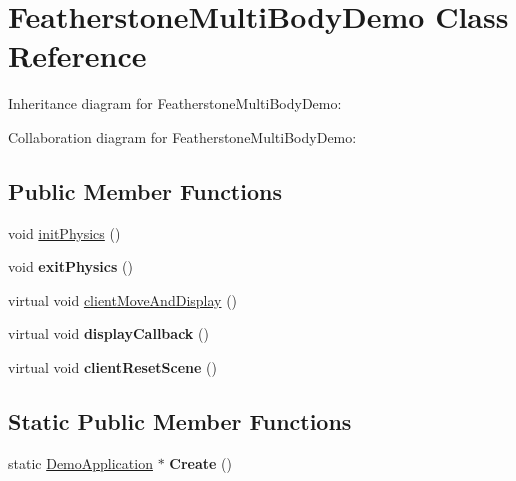 \hypertarget{class_featherstone_multi_body_demo}{\section{Featherstone\+Multi\+Body\+Demo Class Reference}
\label{class_featherstone_multi_body_demo}
}


Inheritance diagram for Featherstone\+Multi\+Body\+Demo\+:


Collaboration diagram for Featherstone\+Multi\+Body\+Demo\+:
\subsection*{Public Member Functions}
\begin{DoxyCompactItemize}
\item 
void \hyperlink{class_featherstone_multi_body_demo_a116aaa16c278e3d63dedc8bede7e2b6a}{init\+Physics} ()
\item 
\hypertarget{class_featherstone_multi_body_demo_aafeff37d67ead023bc30fb135af36867}{void {\bfseries exit\+Physics} ()}\label{class_featherstone_multi_body_demo_aafeff37d67ead023bc30fb135af36867}

\item 
virtual void \hyperlink{class_featherstone_multi_body_demo_a8abceaaea5b14561f88366a45eb18583}{client\+Move\+And\+Display} ()
\item 
\hypertarget{class_featherstone_multi_body_demo_ac59123bb5f419bb7afa6b395a279ba0f}{virtual void {\bfseries display\+Callback} ()}\label{class_featherstone_multi_body_demo_ac59123bb5f419bb7afa6b395a279ba0f}

\item 
\hypertarget{class_featherstone_multi_body_demo_a547476eea0a9a304bbdc699c6806bff8}{virtual void {\bfseries client\+Reset\+Scene} ()}\label{class_featherstone_multi_body_demo_a547476eea0a9a304bbdc699c6806bff8}

\end{DoxyCompactItemize}
\subsection*{Static Public Member Functions}
\begin{DoxyCompactItemize}
\item 
\hypertarget{class_featherstone_multi_body_demo_adb4de8fa41e26c78d97b4fd3a6f6e413}{static \hyperlink{class_demo_application}{Demo\+Application} $\ast$ {\bfseries Create} ()}\label{class_featherstone_multi_body_demo_adb4de8fa41e26c78d97b4fd3a6f6e413}

\end{DoxyCompactItemize}


